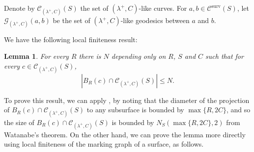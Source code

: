 \documentclass{amsart}
\newcommand{\C}{\mathcal{C}}
\newcommand{\G}{\mathcal{G}}
\newcommand{\Csurv}{\C^{\text{surv}}}
\newtheorem{lemma}[thm]{Lemma}
\theoremstyle{definition}
\begin{document}
Denote by \(\C_{(\lambda^+,C)}(S)\) the set of \((\lambda^+,C)\)-like curves. For \(a,b\in\Csurv(S)\), let \(\G_{(\lambda^+,C)}(a,b)\) be the set of \((\lambda^+,C)\)-like geodesics between \(a\) and \(b\).

We have the following local finiteness result:

\begin{lemma}\label{lem:finiteness}
For every $R$ there is \(N\) depending only on $R$, \(S\) and \(C\) such that for every \(c\in\C_{(\lambda^+,C)}(S)\),
\[\left|B_{R}(c)\cap \C_{(\lambda^+,C)}(S)\right|\leq N.\]
\end{lemma}

To prove this result, we can apply \cite[Theorem A]{watanabe_uniform}, by noting that the diameter of the projection of \(B_{R}(c)\cap \C_{(\lambda^+,C)}(S)\) to any subsurface is bounded by \(\max\{R,2C\}\), and so the size of \(B_{R}(c)\cap \C_{(\lambda^+,C)}(S)\) is bounded by \(N_S(\max\{R,2C\},2)\) from Watanabe's theorem. On the other hand, we can prove the lemma more directly using local finiteness of the marking graph of a surface, as follows.
\end{document}
